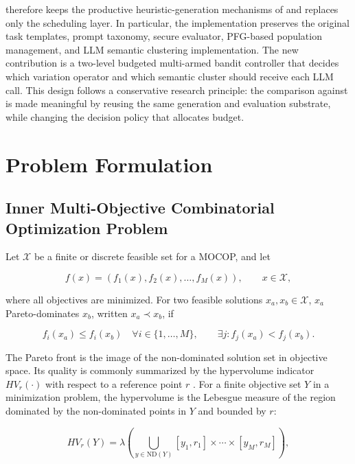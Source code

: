 \documentclass[../main.tex]{subfiles}
\begin{document}
\bmab{} therefore keeps the productive heuristic-generation mechanisms of \mpage{} and replaces only the scheduling layer. In particular, the implementation preserves the original task templates, prompt taxonomy, secure evaluator, PFG-based population management, and LLM semantic clustering implementation. The new contribution is a two-level budgeted multi-armed bandit controller that decides which variation operator and which semantic cluster should receive each LLM call. This design follows a conservative research principle: the comparison against \mpage{} is made meaningful by reusing the same generation and evaluation substrate, while changing the decision policy that allocates budget.

\section{Problem Formulation}

\subsection{Inner Multi-Objective Combinatorial Optimization Problem}

Let $\mathcal{X}$ be a finite or discrete feasible set for a MOCOP, and let

\begin{equation}
  f(x) = \left(f_1(x), f_2(x), \ldots, f_M(x)\right), \qquad x \in \mathcal{X},
\end{equation}

where all objectives are minimized. For two feasible solutions $x_a,x_b \in \mathcal{X}$, $x_a$ Pareto-dominates $x_b$, written $x_a \prec x_b$, if

\begin{equation}
  f_i(x_a) \le f_i(x_b) \quad \forall i \in \{1,\ldots,M\},
  \qquad
  \exists j: f_j(x_a) < f_j(x_b).
\end{equation}

The Pareto front is the image of the non-dominated solution set in objective space. Its quality is commonly summarized by the hypervolume indicator $HV_r(\cdot)$ with respect to a reference point $r$ \cite{zitzler1999multiobjective,fonseca2006hv}. For a finite objective set $Y$ in a minimization problem, the hypervolume is the Lebesgue measure of the region dominated by the non-dominated points in $Y$ and bounded by $r$:

\[
  HV_r(Y)
  =
  \lambda\!\left(
    \bigcup_{y \in \mathrm{ND}(Y)}
    [y_1,r_1]\times \cdots \times [y_M,r_M]
  \right),
\]
\end{document}
